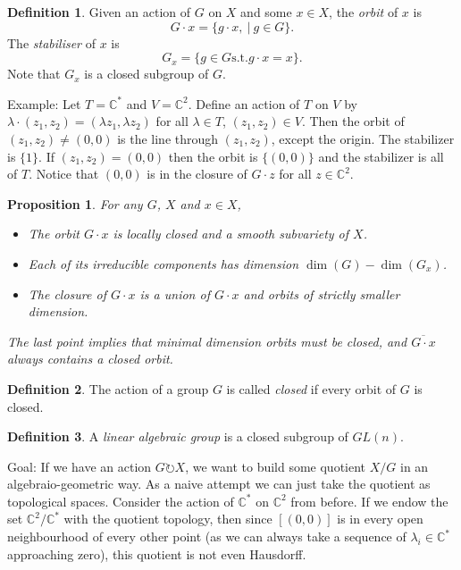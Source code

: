\documentclass{article}
\newtheorem{prop}{Proposition}
\theoremstyle{definition}
\newtheorem{defn}{Definition}
\newcommand{\C}{\mathbb{C}}
\begin{document}
\begin{defn}
	Given an action of $G$ on $X$ and some $x\in X$, the \emph{orbit} of $x$ is
	\begin{equation}
		G\cdot x = \{g\cdot x, ~|~g\in G\}.
	\end{equation}
	The \emph{stabiliser} of $x$ is 
	\begin{equation}
		G_x = \{g\in G \text{s.t.} g\cdot x = x\}.
	\end{equation}
	Note that $G_x$ is a closed subgroup of $G$. 
\end{defn}
Example: Let $T=\C^\ast$ and $V=\C^2$. Define an action of $T$ on $V$ by $\lambda\cdot(z_1,z_2) = (\lambda z_1, \lambda z_2)$ for all $\lambda \in T$, $(z_1,z_2)\in V$. Then the orbit of $(z_1,z_2)\neq(0,0)$ is the line through $(z_1,z_2)$, except the origin. The stabilizer is $\{1\}$. If $(z_1,z_2)=(0,0)$ then the orbit is $\{(0,0)\}$ and the stabilizer is all of $T$. Notice that $(0,0)$ is in the closure of $G\cdot z$ for all $z\in \C^2$. 
\begin{prop}
	For any $G$, $X$ and $x\in X$, 
	\begin{itemize}
		\item The orbit $G\cdot x$ is locally closed and a smooth subvariety of $X$.
		\item Each of its irreducible components has dimension $\dim(G)-\dim(G_x)$.
		\item The closure of $G\cdot x$ is a union of $G\cdot x$ and orbits of strictly smaller dimension.
	\end{itemize}
	The last point implies that minimal dimension orbits must be closed, and $\overline{G\cdot x}$ always contains a closed orbit.
\end{prop}
\begin{defn}
	The action of a group $G$ is called \emph{closed} if every orbit of $G$ is closed.
\end{defn}
\begin{defn}
	A \emph{linear algebraic group} is a closed subgroup of $GL(n)$.
\end{defn}
Goal: If we have an action $G\circlearrowright X$, we want to build some quotient $X/G$ in an algebraio-geometric way. As a naive attempt we can just take the quotient as topological spaces. Consider the action of $\C^\ast$ on $\C^2$ from before. If we endow the set $\C^2/\C^\ast$ with the quotient topology, then since $[(0,0)]$ is in every open neighbourhood of every other point (as we can always take a sequence of $\lambda_i\in\C^\ast$ approaching zero), this quotient is not even Hausdorff. \vspace{1em}
\end{document}
